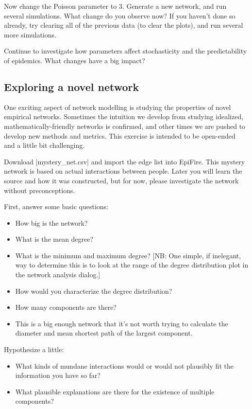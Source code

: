 \documentclass{article}
\begin{document}
Now change the Poisson parameter to 3.  Generate a new network, and run several simulations.  What change do you observe now?  If you haven't done so already, try clearing all of the previous data (to clear the plots), and run several more simulations.

Continue to investigate how parameters affect stochasticity and the predictability of epidemics.  What changes have a big impact?

\subsection{Exploring a novel network}
One exciting aspect of network modelling is studying the properties of novel empirical networks.  Sometimes the intuition
we develop from studying idealized, mathematically-friendly networks is confirmed, and other times we are pushed to develop
new methods and metrics.  This exercise is intended to be open-ended and a little bit challenging.

Download |mystery_net.csv| and import the edge list into EpiFire.  This mystery network is based on actual interactions
between people. Later you will learn the source and how it was constructed, but for now, please investigate the network
without preconceptions.

First, answer some basic questions:
\begin{itemize}
 \item How big is the network?
 \item What is the mean degree?
 \item What is the minimum and maximum degree? [NB: One simple, if inelegant, way to determine this is to look at the
 range of the degree distribution plot in the network analysis dialog.]
 \item How would you characterize the degree distribution?
 \item How many components are there?
 \item This is a big enough network that it's not worth trying to calculate the diameter and mean shortest path of the
 largest component.
\end{itemize}

Hypothesize a little:
\begin{itemize}
 \item What kinds of mundane interactions would or would not plausibly fit the information you have so far?
 \item What plausible explanations are there for the existence of multiple components?
\end{itemize}
\end{document}
